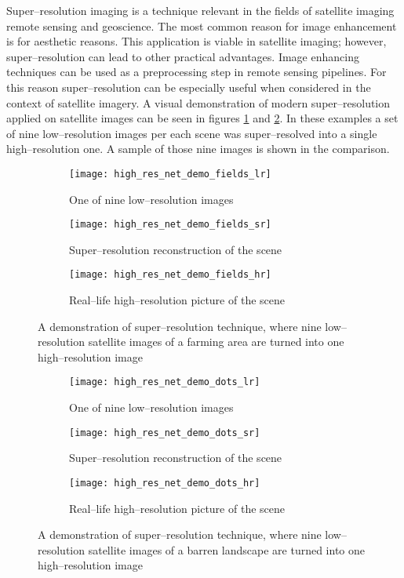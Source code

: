 Super--resolution imaging is a technique relevant in the fields of satellite imaging
remote sensing and geoscience.
The most common reason for image enhancement is for aesthetic reasons.
This application is viable in satellite imaging; however, super--resolution can
lead to other practical advantages.
Image enhancing techniques can be used as a preprocessing step in remote
sensing pipelines.
For this reason super--resolution can be especially useful when considered in
the context of satellite imagery.
A visual demonstration of modern super--resolution applied on satellite images can be seen in figures \ref{fig:super-res-fields-demo} and \ref{fig:super-res-dots-demo}.
In these examples a set of nine low--resolution images per each scene was super--resolved into a single high--resolution one.
A sample of those nine images is shown in the comparison.
\begin{figure}[p]
    \centering
    \begin{subfigure}[t]{0.31\textwidth}
        \centering
        \texttt{[image: high\_res\_net\_demo\_fields\_lr]}
        \caption{One of nine low--resolution images}
    \end{subfigure}
    \hfill
    \begin{subfigure}[t]{0.31\textwidth}
        \centering
        \texttt{[image: high\_res\_net\_demo\_fields\_sr]}
        \caption{Super--resolution reconstruction of the scene}
    \end{subfigure}
    \hfill
    \begin{subfigure}[t]{0.31\textwidth}
        \centering
        \texttt{[image: high\_res\_net\_demo\_fields\_hr]}
        \caption{Real--life high--resolution picture of the scene}
    \end{subfigure}
    \caption{A demonstration of super--resolution technique, where nine low--resolution satellite images of a farming area are turned into one  high--resolution image}
    \label{fig:super-res-fields-demo}
\end{figure}
\begin{figure}[p]
    \centering
    \begin{subfigure}[t]{0.31\textwidth}
        \centering
        \texttt{[image: high\_res\_net\_demo\_dots\_lr]}
        \caption{One of nine low--resolution images}
    \end{subfigure}
    \hfill
    \begin{subfigure}[t]{0.31\textwidth}
        \centering
        \texttt{[image: high\_res\_net\_demo\_dots\_sr]}
        \caption{Super--resolution reconstruction of the scene}
    \end{subfigure}
    \hfill
    \begin{subfigure}[t]{0.31\textwidth}
        \centering
        \texttt{[image: high\_res\_net\_demo\_dots\_hr]}
        \caption{Real--life high--resolution picture of the scene}
    \end{subfigure}
    \caption{A demonstration of super--resolution technique, where nine low--resolution satellite images of a barren landscape are turned into one  high--resolution image}
    \label{fig:super-res-dots-demo}
\end{figure}

